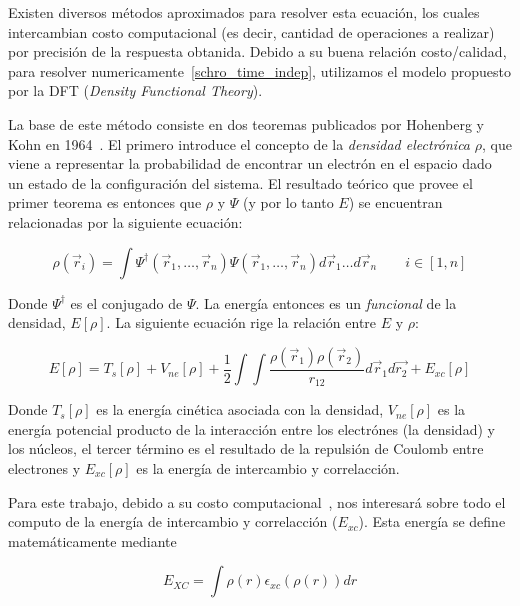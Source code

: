Existen diversos m\'etodos aproximados para resolver esta ecuaci\'on, los cuales intercambian costo computacional (es decir, cantidad de operaciones a realizar)
por precisi\'on de la respuesta obtanida. Debido a su buena relaci\'on costo/calidad, para resolver numericamente~\ref{schro_time_indep}, utilizamos el modelo propuesto por la
DFT (\textit{Density Functional Theory}).

La base de este m\'etodo consiste en dos teoremas publicados por Hohenberg y Kohn en 1964~\cite{HohenbergKohn}. El primero introduce el concepto de la \textit{densidad electr\'onica} $\rho$, que viene a representar la probabilidad de encontrar un electr\'on en
el espacio dado un estado de la configuraci\'on del sistema. El resultado te\'orico que provee el primer teorema es entonces que
$\rho$ y $\Psi$ (y por lo tanto $E$) se encuentran relacionadas por la siguiente ecuaci\'on:

\begin{equation}
    \label{hohenberg_kohn}
    \rho(\vec{r}_i) = \int \Psi^{\dagger}(\vec{r}_1, \dots, \vec{r}_n) \Psi(\vec{r}_1, \dots, \vec{r}_n) d\vec{r}_1 \dots d\vec{r}_n \qquad i \in [1,n]
\end{equation}

Donde $\Psi^{\dagger}$ es el conjugado de $\Psi$. La energ\'ia entonces es un \textit{funcional} de la densidad, $E[\rho]$.
La siguiente ecuaci\'on rige la relaci\'on entre $E$ y $\rho$:

\begin{equation}
    \label{hohenberg_kohn_energy}
    E[\rho] = T_s[\rho] + V_{ne}[\rho] + \frac{1}{2} \int \int \frac{\rho(\vec{r}_1) \rho(\vec{r}_2)}{r_{12}} d\vec{r}_1 d\vec{r_2} + E_{xc}[\rho]
\end{equation}

Donde $T_s[\rho]$ es la energ\'ia cin\'etica asociada con la densidad, $V_{ne}[\rho]$ es la energ\'ia potencial producto de la interacci\'on entre los
electr\'ones (la densidad) y los n\'ucleos, el tercer t\'ermino es el resultado de la repulsi\'on de Coulomb entre electrones y $E_{xc}[\rho]$ es la
energ\'ia de intercambio y correlacci\'on.

Para este trabajo, debido a su costo computacional~\cite{LIO}, nos interesar\'a sobre todo el computo de la energ\'ia de intercambio y correlacci\'on ($E_{xc}$).
Esta energ\'ia se define matem\'aticamente mediante

\begin{equation}
    E_{XC} = \int \rho(r) \epsilon_{xc}\left( \rho(r) \right ) dr
\end{equation}

